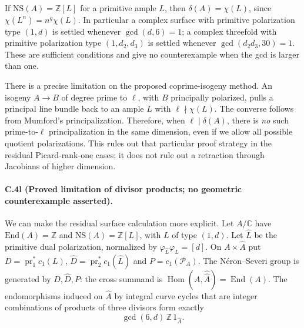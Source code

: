If $\mathrm{NS}(A)=\mathbb Z[L]$ for a primitive ample $L$, then
$\delta(A)=\chi(L)$, since $\chi(L^n)=n^g\chi(L)$.
In particular a complex surface with primitive polarization type
$(1,d)$ is settled whenever $\gcd(d,6)=1$; a complex threefold
with primitive polarization type $(1,d_2,d_3)$ is settled whenever
$\gcd(d_2d_3,30)=1$.
These are sufficient conditions and give no counterexample when
the gcd is larger than one.

There is a precise limitation on the proposed coprime-isogeny
method. An isogeny $A\to B$ of degree prime to $\ell$, with $B$
principally polarized, pulls a principal line bundle back to an
ample $L$ with $\ell\nmid\chi(L)$. The converse follows from
Mumford's principalization. Therefore, when $\ell\mid\delta(A)$,
there is \emph{no} such prime-to-$\ell$ principalization in the same
dimension, even if we allow all possible quotient polarizations.
This rules out that particular proof strategy in the residual
Picard-rank-one cases; it does not rule out a retraction through
Jacobians of higher dimension.

\paragraph{C.4l (Proved limitation of divisor products; no geometric counterexample asserted).}
We can make the residual surface calculation more explicit.
Let $A/\mathbb C$ have $\mathrm{End}(A)=\mathbb Z$ and
$\mathrm{NS}(A)=\mathbb Z[L]$, with $L$ of type $(1,d)$.
Let $\widehat L$ be the primitive dual polarization, normalized by
$\varphi_{\widehat L}\varphi_L=[d]$.
On $A\times\widehat A$ put
$D=\operatorname{pr}_1^*c_1(L)$,
$\widehat D=\operatorname{pr}_2^*c_1(\widehat L)$ and
$P=c_1(\mathcal P_A)$.
The N\'eron--Severi group is generated by
$D,\widehat D,P$: the cross summand is
$\operatorname{Hom}(A,\widehat{\widehat A})=\operatorname{End}(A)$.
The endomorphisms induced on $\widehat A$ by integral curve cycles
that are integer combinations of products of three divisors form
exactly
\begin{equation}\label{eq:c4-divisor-product-ideal}
                         \gcd(6,d)\,\mathbb Z\,1_{\widehat A}.
\end{equation}

